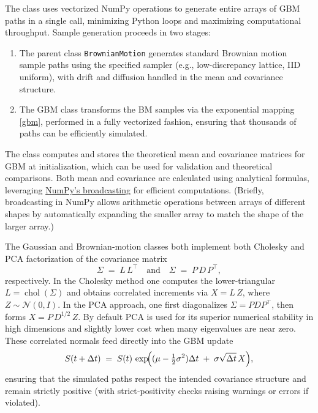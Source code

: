 \documentclass{article}
\begin{document}
The class uses vectorized NumPy operations to generate entire arrays of GBM paths in a single call, minimizing Python loops and maximizing computational throughput. Sample generation proceeds in two stages:
\begin{enumerate}
\item 
The parent class \texttt{BrownianMotion} generates standard Brownian motion sample paths using the specified sampler (e.g., low-discrepancy lattice, IID uniform), with drift and diffusion handled in the mean and covariance structure.
\item  The GBM class transforms the BM samples via the exponential mapping    \eqref{gbm}, performed in a fully vectorized fashion, ensuring that thousands of paths can be efficiently simulated.
\end{enumerate}
The class computes and stores the theoretical mean and covariance matrices for GBM at initialization, which can be used for validation and theoretical comparisons. Both mean and covariance are calculated using analytical formulas, leveraging \href{https://numpy.org/devdocs/user/basics.broadcasting.html}{NumPy’s broadcasting} for efficient computations. (Briefly, broadcasting in NumPy allows arithmetic operations between arrays of different shapes by automatically expanding the smaller array to match the shape of the larger array.)

 The Gaussian and Brownian‐motion classes both implement both Cholesky and PCA factorization of the covariance matrix
\[
\Sigma \;=\; L\,L^{\!\top}
\quad\text{and}\quad
\Sigma \;=\; P\,D\,P^{\!\top},
\]
respectively.  In the Cholesky method one computes the lower‐triangular $L=\operatorname{chol}(\Sigma)$ and obtains correlated increments via $X=L\,Z$, where $Z\sim\mathcal{N}(0,I)$.  In the PCA approach, one first diagonalizes $\Sigma=PDP^{\!\top}$, then forms $X = P\,D^{1/2}\,Z$.  By default PCA is used for its superior numerical stability in high dimensions and slightly lower cost when many eigenvalues are near zero.  These correlated normals feed directly into the GBM update
\[
S(t+\Delta t) \;=\; S(t)\,\exp\!\Bigl((\mu - \tfrac12\sigma^2)\Delta t \;+\;\sigma\sqrt{\Delta t}\,X\Bigr),
\]
ensuring that the simulated paths respect the intended covariance structure and remain strictly positive (with strict‐positivity checks raising warnings or errors if violated).
\end{document}
